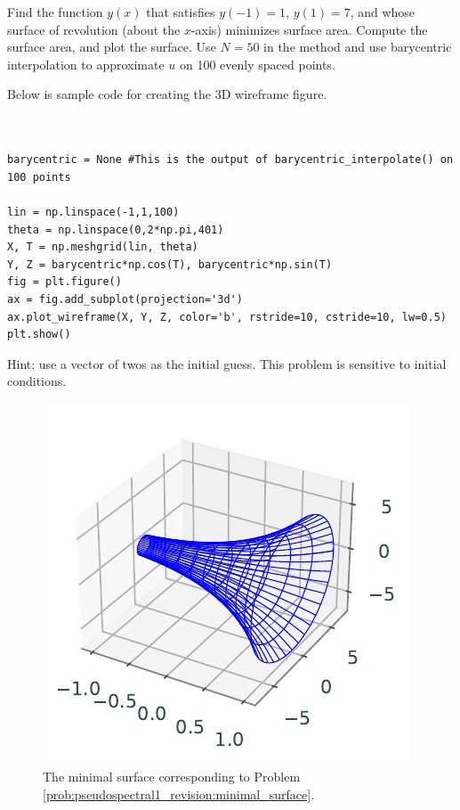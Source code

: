 \begin{problem}
Find the function $y(x)$ that satisfies $y(-1) = 1$, $y(1) = 7$, and whose surface of revolution (about the $x$-axis) minimizes surface area.
Compute the surface area, and plot the surface. \label{prob:pseudospectral1:minimal_surface}
Use $N=50$ in the  method and use barycentric interpolation to approximate $u$ on 100 evenly spaced points.

Below is sample code for creating the 3D wireframe figure.
\begin{lstlisting}


barycentric = None #This is the output of barycentric_interpolate() on 100 points

lin = np.linspace(-1,1,100)
theta = np.linspace(0,2*np.pi,401)
X, T = np.meshgrid(lin, theta)
Y, Z = barycentric*np.cos(T), barycentric*np.sin(T)
fig = plt.figure()
ax = fig.add_subplot(projection='3d')
ax.plot_wireframe(X, Y, Z, color='b', rstride=10, cstride=10, lw=0.5)
plt.show()
\end{lstlisting}

Hint: use a vector of twos as the initial guess. This problem is sensitive to initial conditions.

\end{problem}

\begin{figure}
\centering
\includegraphics[width=\textwidth]{figures/minimal_surface.pdf}
\caption{The minimal surface corresponding to Problem  \ref{prob:pseudospectral1_revision:minimal_surface}.}
\label{fig:pseudospectral1:minimal_surface}
\end{figure}

